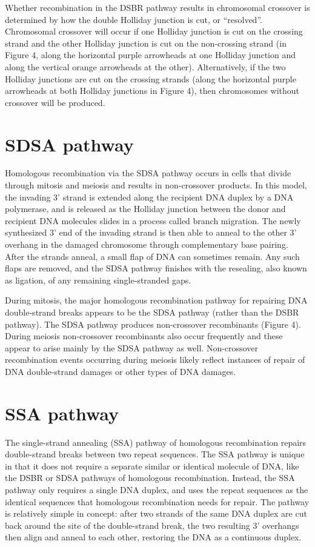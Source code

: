 Whether recombination in the DSBR pathway results in chromosomal crossover is determined by how the double Holliday junction is cut, or ``resolved''. Chromosomal crossover will occur if one Holliday junction is cut on the crossing strand and the other Holliday junction is cut on the non-crossing strand (in Figure 4, along the horizontal purple arrowheads at one Holliday junction and along the vertical orange arrowheads at the other). Alternatively, if the two Holliday junctions are cut on the crossing strands (along the horizontal purple arrowheads at both Holliday junctions in Figure 4), then chromosomes without crossover will be produced.

\hypertarget{sdsa-pathway}{%
\section{SDSA pathway}\label{sdsa-pathway}}

Homologous recombination via the SDSA pathway occurs in cells that divide through mitosis and meiosis and results in non-crossover products. In this model, the invading 3' strand is extended along the recipient DNA duplex by a DNA polymerase, and is released as the Holliday junction between the donor and recipient DNA molecules slides in a process called branch migration. The newly synthesized 3' end of the invading strand is then able to anneal to the other 3' overhang in the damaged chromosome through complementary base pairing. After the strands anneal, a small flap of DNA can sometimes remain. Any such flaps are removed, and the SDSA pathway finishes with the resealing, also known as ligation, of any remaining single-stranded gaps.

During mitosis, the major homologous recombination pathway for repairing DNA double-strand breaks appears to be the SDSA pathway (rather than the DSBR pathway). The SDSA pathway produces non-crossover recombinants (Figure 4). During meiosis non-crossover recombinants also occur frequently and these appear to arise mainly by the SDSA pathway as well. Non-crossover recombination events occurring during meiosis likely reflect instances of repair of DNA double-strand damages or other types of DNA damages.

\hypertarget{ssa-pathway}{%
\section{SSA pathway}\label{ssa-pathway}}

The single-strand annealing (SSA) pathway of homologous recombination repairs double-strand breaks between two repeat sequences. The SSA pathway is unique in that it does not require a separate similar or identical molecule of DNA, like the DSBR or SDSA pathways of homologous recombination. Instead, the SSA pathway only requires a single DNA duplex, and uses the repeat sequences as the identical sequences that homologous recombination needs for repair. The pathway is relatively simple in concept: after two strands of the same DNA duplex are cut back around the site of the double-strand break, the two resulting 3' overhangs then align and anneal to each other, restoring the DNA as a continuous duplex.

